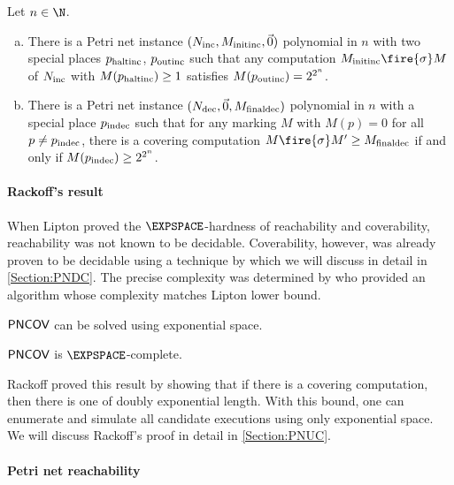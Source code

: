 \documentclass[../../diss.tex]{subfiles}
\begin{document}
\begin{proposition}%
\label{Proposition:Lipton}%
    Let $n \in \N$.
    \begin{enumerate}[a)]
        \item
            There is a Petri net instance $(N_{\text{inc}},M_{{\text{init}}{\text{inc}}},\vec{0})$ polynomial in $n$ with two special places $p_{\text{haltinc}}$, $p_{\text{outinc}}$ such that any computation $\Minitinc \fire{\sigma} M$ of $N_{\text{inc}}$ with $M(p_{\text{haltinc}}) \geq 1$ satisfies $M(p_{\text{outinc}}) = 2^{2^n}$.
        \item
            There is a Petri net instance $(N_{\text{dec}},\vec{0},M_{{\text{final}}{\text{dec}}})$ polynomial in $n$ with a special place $p_{\text{indec}}$ such that for any marking $M$ with $M(p) = 0$ for all $p \neq p_{\text{indec}}$, there is a covering computation $M \fire{\sigma} M' \geq \Mfinaldec$ if and only if $M(p_{\text{indec}}) \geq 2^{2^n}$.
    \end{enumerate}
\end{proposition}

\paragraph{Rackoff's result}

When Lipton proved the $\EXPSPACE$-hardness of reachability and coverability, reachability was not known to be decidable.
Coverability, however, was already proven to be decidable using a technique by  which we will discuss in detail in \cref{Section:PNDC}.
The precise complexity was determined by  who provided an algorithm whose complexity matches Lipton lower bound.

\begin{theorem}
    $\mathsf{PNCOV}$ can be solved using exponential space.
\end{theorem}

\begin{corollary}
    $\mathsf{PNCOV}$ is $\EXPSPACE$-complete.
\end{corollary}

Rackoff proved this result by showing that if there is a covering computation, then there is one of doubly exponential length.
With this bound, one can enumerate and simulate all candidate executions using only exponential space.
We will discuss Rackoff's proof in detail in \cref{Section:PNUC}.

\paragraph{Petri net reachability}
\end{document}
